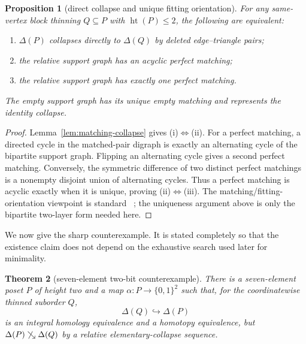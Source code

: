 \documentclass[11pt]{article}
\newtheorem{theorem}{Theorem}[section]
\newtheorem{proposition}[theorem]{Proposition}
\theoremstyle{definition}
\theoremstyle{remark}
\DeclareMathOperator{\posht}{ht}
\newcommand{\D}{\Delta}
\newcommand{\searrowrel}{\mathrel{\searrow}}
\begin{document}
\begin{proposition}[direct collapse and unique fitting orientation]\label{prop:unique-matching}
For any same-vertex block thinning $Q\subseteq P$ with $\posht(P)\le2$, the following are
equivalent:
\begin{enumerate}[label=(\roman*)]
\item $\D(P)$ collapses directly to $\D(Q)$ by deleted edge--triangle pairs;
\item the relative support graph has an acyclic perfect matching;
\item the relative support graph has exactly one perfect matching.
\end{enumerate}
The empty support graph has its unique empty matching and represents the identity
collapse.
\end{proposition}

\begin{proof}
Lemma~\ref{lem:matching-collapse} gives (i)$\Longleftrightarrow$(ii).  For a perfect
matching, a directed cycle in the matched-pair digraph is exactly an alternating cycle
of the bipartite support graph.  Flipping an alternating cycle gives a second perfect
matching.  Conversely, the symmetric difference of two distinct perfect matchings is
a nonempty disjoint union of alternating cycles.  Thus a perfect matching is acyclic
exactly when it is unique, proving (ii)$\Longleftrightarrow$(iii).  The matching/fitting-orientation viewpoint is standard
~\cite{Forman1998,BernardiKlivans2016,ContrerasTawfeek2024}; the uniqueness argument
above is only the bipartite two-layer form needed here.
\end{proof}

We now give the sharp counterexample.  It is stated completely so that the existence
claim does not depend on the exhaustive search used later for minimality.

\begin{theorem}[seven-element two-bit counterexample]\label{thm:seven}
There is a seven-element poset $P$ of height two and a map
$\alpha:P\to\{0,1\}^2$ such that, for the coordinatewise thinned suborder $Q$,
\[
  \D(Q)\hookrightarrow\D(P)
\]
is an integral homology equivalence and a homotopy equivalence, but
$\D(P)\not\searrowrel\D(Q)$ by a relative elementary-collapse sequence.
\end{theorem}
\end{document}
